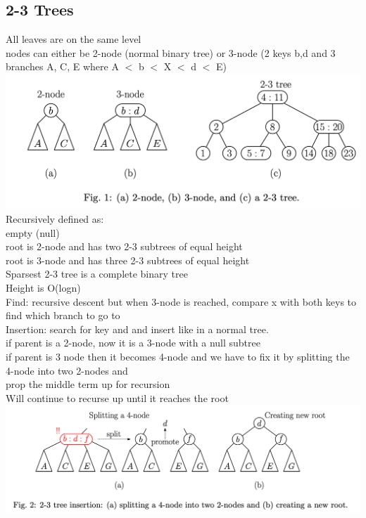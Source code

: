 \documentclass{article}
\begin{document}
  \subsection{2-3 Trees}
  All leaves are on the same level \\
  nodes can either be 2-node (normal binary tree) or 3-node (2 keys b,d and 3 branches A, C, E where A $<$ b $<$ X $<$ d $<$ E)\\
  \includegraphics[width=\textwidth]{2-3Tree}
  Recursively defined as: \\
  \indent empty (null) \\
  \indent root is 2-node and has two 2-3 subtrees of equal height \\
  \indent root is 3-node and has three 2-3 subtrees of equal height \\
  Sparsest 2-3 tree is a complete binary tree \\
  Height is O(logn) \\
  Find: recursive descent but when 3-node is reached, compare x with both keys to find which branch to go to\\
  Insertion: search for key and and insert like in a normal tree. \\
  \indent if parent is a 2-node, now it is a 3-node with a null subtree \\
  \indent if parent is 3 node then it becomes 4-node and we have to fix it by splitting the 4-node into two 2-nodes and \\ 
  \indent prop the middle term up for recursion\\
  \indent \indent Will continue to recurse up until it reaches the root \\
  \includegraphics[width=\textwidth]{2-3TreeInsert}
\end{document}
